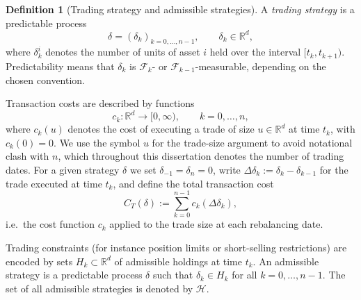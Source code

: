 \documentclass[12pt,a4paper]{article}
\theoremstyle{definition}
\newtheorem{definition}{Definition}[section]
\theoremstyle{plain}
\theoremstyle{remark}
\theoremstyle{plain}
\begin{document}
\begin{definition}[Trading strategy and admissible strategies]
\label{def:trading_strategy}
A \emph{trading strategy} is a predictable process
\[
    \delta = (\delta_k)_{k=0,\dots,n-1}, \qquad \delta_k \in \mathbb R^d,
\]
where $\delta^i_k$ denotes the number of units of asset $i$ held over the interval $[t_k,t_{k+1})$. 
Predictability means that $\delta_k$ is $\mathcal F_{k}$- or $\mathcal F_{k-1}$-measurable, depending on the chosen convention.

Transaction costs are described by functions
\[
    c_k : \mathbb R^d \to [0,\infty), \qquad k=0,\dots,n,
\]
where $c_k(u)$ denotes the cost of executing a trade of size $u \in \mathbb{R}^d$ at time $t_k$, with $c_k(0)=0$. We use the symbol $u$ for the trade-size argument to avoid notational clash with $n$, which throughout this dissertation denotes the number of trading dates.
For a given strategy $\delta$ we set $\delta_{-1}=\delta_n=0$, write $\Delta \delta_k := \delta_k - \delta_{k-1}$ for the trade executed at time $t_k$, and define the total transaction cost
\[
    C_T(\delta) := \sum_{k=0}^{n-1} c_k(\Delta \delta_k),
\]
i.e.\ the cost function $c_k$ applied to the trade size at each rebalancing date.

Trading constraints (for instance position limits or short-selling restrictions) are encoded by sets $H_k\subset\mathbb R^d$ of admissible holdings at time $t_k$. 
An admissible strategy is a predictable process $\delta$ such that $\delta_k\in H_k$ for all $k=0,\dots,n-1$. 
The set of all admissible strategies is denoted by $\mathcal H$.
\end{definition}
\end{document}
